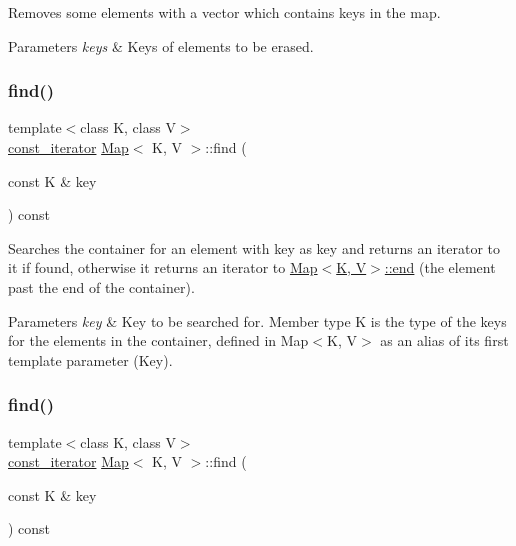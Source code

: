 Removes some elements with a vector which contains keys in the map.


\begin{DoxyParams}{Parameters}
{\em keys} & Keys of elements to be erased. \\
\hline
\end{DoxyParams}
\mbox{\label{classMap_ada247c3c8f2626ef3c404922807f0b9a}} 
\subsubsection{\texorpdfstring{find()}{find()}\hspace{0.1cm}{\footnotesize\ttfamily [1/2]}}
{\footnotesize\ttfamily template$<$class K, class V$>$ \\
\hyperlink{classMap_add90fe1e25806ba6f6278b264e78ee9a}{const\+\_\+iterator} \hyperlink{classMap}{Map}$<$ K, V $>$\+::find (\begin{DoxyParamCaption}\item[{const K \&}]{key }\end{DoxyParamCaption}) const\hspace{0.3cm}{\ttfamily [inline]}}

Searches the container for an element with \textquotesingle{}key\textquotesingle{} as key and returns an iterator to it if found, otherwise it returns an iterator to \hyperlink{classMap_af7192ef1dd6fb558c06442c00a4c516e}{Map$<$\+K, V$>$\+::end} (the element past the end of the container).


\begin{DoxyParams}{Parameters}
{\em key} & Key to be searched for. Member type \textquotesingle{}K\textquotesingle{} is the type of the keys for the elements in the container, defined in Map$<$\+K, V$>$ as an alias of its first template parameter (Key). \\
\hline
\end{DoxyParams}
\mbox{\label{classMap_ada247c3c8f2626ef3c404922807f0b9a}} 
\subsubsection{\texorpdfstring{find()}{find()}\hspace{0.1cm}{\footnotesize\ttfamily [2/2]}}
{\footnotesize\ttfamily template$<$class K, class V$>$ \\
\hyperlink{classMap_add90fe1e25806ba6f6278b264e78ee9a}{const\+\_\+iterator} \hyperlink{classMap}{Map}$<$ K, V $>$\+::find (\begin{DoxyParamCaption}\item[{const K \&}]{key }\end{DoxyParamCaption}) const\hspace{0.3cm}{\ttfamily [inline]}}

